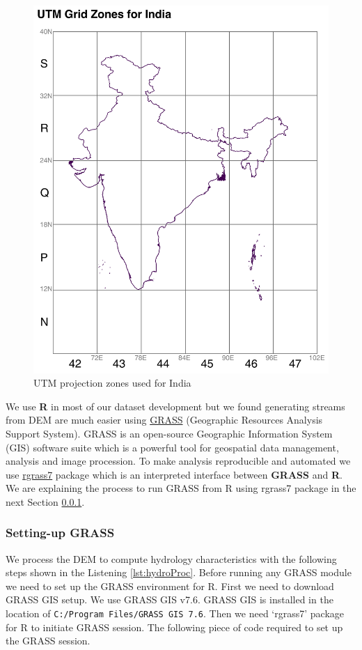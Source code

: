 \documentclass[a4paper, 12pt]{article}
\begin{document}
\begin{figure}[!h]
\noindent
\includegraphics[width = 1\textwidth]{Figures/UTM_Zones.pdf}
\caption{UTM projection zones used for India}
\label{fig:UTM}
\end{figure}

We use \textbf{R} in most of our dataset development but we found generating streams from DEM are much easier using \href{https://grass.osgeo.org/}{GRASS} (Geographic Resources Analysis Support System). GRASS is an open-source Geographic Information System (GIS) software suite which is a powerful tool for geospatial data management, analysis and image procession. To make analysis reproducible and automated we use \href{https://cran.r-project.org/web/packages/rgrass7/index.html}{rgrass7} package which is an interpreted interface between \textbf{GRASS} and \textbf{R}.
We are explaining the process to run GRASS from R using rgrass7 package in the next Section \ref{sec:grass}.

\subsubsection{Setting-up GRASS}\label{sec:grass}
We process the DEM to compute hydrology characteristics with the following steps shown in the Listening \ref{lst:hydroProc}. Before running any GRASS module we need to set up the GRASS environment for R. First we need to download GRASS GIS setup. We use GRASS GIS v7.6. GRASS GIS is installed in the location of \texttt{C:/Program Files/GRASS GIS 7.6}. Then we need `rgrass7' package for R to initiate GRASS session. The following piece of code required to set up the GRASS session.
\end{document}
